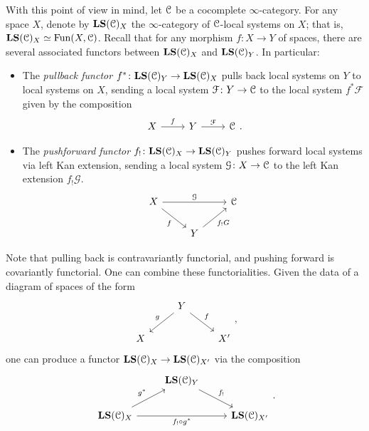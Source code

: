 \documentclass[main.tex]{subfiles}
\begin{document}
With this point of view in mind, let $\mathcal{C}$ be a cocomplete $\infty$-category. For any space $X$, denote by $\mathbf{LS}(\mathcal{C})_{X}$ the $\infty$-category of $\mathcal{C}$-local systems on $X$; that is, $\mathbf{LS}(\mathcal{C})_{X} \simeq \mathrm{Fun}(X, \mathcal{C})$. Recall that for any morphism $f\colon X \to Y$ of spaces, there are several associated functors between $\mathbf{LS}(\mathcal{C})_{X}$ and $\mathbf{LS}(\mathcal{C})_{Y}$. In particular:
\begin{itemize}
  \item The \emph{pullback functor} $f^{*}\colon \mathbf{LS}(\mathcal{C})_{Y} \to \mathbf{LS}(\mathcal{C})_{X}$ pulls back local systems on $Y$ to local systems on $X$, sending a local system $\mathcal{F}\colon Y \to \mathcal{C}$ to the local system $f^{*}\mathcal{F}$ given by the composition
    \begin{equation*}
      \begin{tikzcd}
        X
        \arrow[r, "f"]
        & Y
        \arrow[r, "\mathcal{F}"]
        & \category{C}
      \end{tikzcd}.
    \end{equation*}

  \item The \emph{pushforward functor} $f_{!}\colon \mathbf{LS}(\mathcal{C})_{X} \to \mathbf{LS}(\mathcal{C})_{Y}$ pushes forward local systems via left Kan extension, sending a local system $\mathcal{G}\colon X \to \mathcal{C}$ to the left Kan extension $f_{!}\mathcal{G}$.
    \begin{equation*}
      \begin{tikzcd}
        X
        \arrow[rr, "\mathcal{G}"]
        \arrow[dr, swap, "f"]
        && \category{C}
        \\
        & Y
        \arrow[ur, swap, "f_{!}G"]
      \end{tikzcd}
    \end{equation*}
\end{itemize}

Note that pulling back is contravariantly functorial, and pushing forward is covariantly functorial. One can combine these functorialities. Given the data of a diagram of spaces of the form
\begin{equation}
  \label{eq:span}
  \begin{tikzcd}
    & Y
    \arrow[dl, swap, "g"]
    \arrow[dr, "f"]
    \\
    X
    && X'
  \end{tikzcd},
\end{equation}
one can produce a functor $\mathbf{LS}(\mathcal{C})_{X} \to \mathbf{LS}(\mathcal{C})_{X'}$ via the composition
\begin{equation*}
  \begin{tikzcd}
    & \LS(\category{C})_{Y}
    \arrow[dr, "f_{!}"]
    \\
    \LS(\category{C})_{X}
    \arrow[ur, "g^{*}"]
    \arrow[rr, swap, "f_{!} \circ g^{*}"]
    && \LS(\category{C})_{X'}
  \end{tikzcd}.
\end{equation*}
\end{document}
